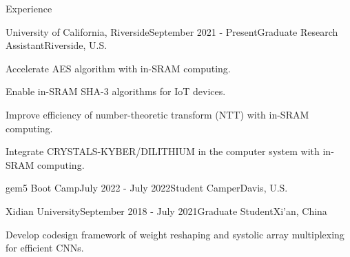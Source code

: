 \documentclass{resume} %
\begin{document}
\begin{rSection}{Experience}
	\begin{rSubsection}{University of California, Riverside}{September 2021 - Present}{Graduate Research Assistant}{Riverside, U.S.}
	\item Accelerate AES algorithm with in-SRAM computing.
	\item Enable in-SRAM SHA-3 algorithms for IoT devices.
        \item Improve efficiency of number-theoretic transform (NTT) with in-SRAM computing.
        \item Integrate CRYSTALS-KYBER/DILITHIUM in the computer system with in-SRAM computing.
    \end{rSubsection}
    \begin{rSubsection}{gem5 Boot Camp}{July 2022 - July 2022}{Student Camper}{Davis, U.S.}
    \end{rSubsection}
	\begin{rSubsection}{Xidian University}{September 2018 - July 2021}{Graduate Student}{Xi'an, China}
	\item Develop codesign framework of weight reshaping and systolic array multiplexing for efficient CNNs.
    \end{rSubsection}	
\end{rSection}
\end{document}
